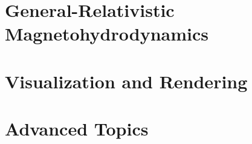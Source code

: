 \documentclass{ehbook}
\begin{document}
\part{General-Relativistic Magnetohydrodynamics}




\part{Visualization and Rendering}




\part{Advanced Topics}


\appendix




\backmatter

\printbibliography[heading=bibintoc, title={Bibliography}]
\end{document}
